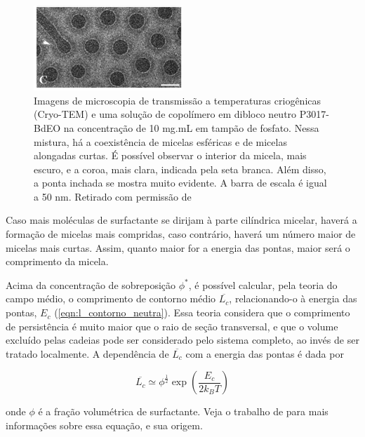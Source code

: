 		\begin{figure}[h]
			\centering
			\includegraphics[width=0.5\textwidth]{imagens/artigos/Cryo_TEM_Pontas_Danino_2009}
			\caption{Imagens de microscopia de transmissão a temperaturas criogênicas (Cryo-TEM) e uma solução de copolímero em dibloco neutro P3017-BdEO na concentração de 10 mg.mL\menosUm{} em tampão de fosfato. Nessa mistura, há a coexistência de micelas esféricas e de micelas alongadas curtas. É possível observar o interior da micela, mais escuro, e a coroa, mais clara, indicada pela seta branca. Além disso, a ponta inchada se mostra muito evidente. A barra de escala é igual a 50 nm. Retirado com permissão de \citeauthor{Shimoni2009}}
			\label{fig:pontas_inchadas_danino2009}
		\end{figure} 
				
		Caso mais moléculas de surfactante se dirijam à parte cilíndrica micelar, haverá a formação de micelas mais compridas, caso contrário, haverá um número maior de micelas mais curtas. Assim, quanto maior for a energia das pontas, maior será o comprimento da micela.\cite{May2001a}
		
		Acima da concentração de sobreposição \(\phi^*\), é possível calcular, pela teoria do campo médio, o comprimento de contorno médio \(\overline{L_c}\), relacionando-o à energia das pontas, \(E_c\) (\autoref{eqn:l_contorno_neutra})\cite{Cates1990}. Essa teoria considera que o comprimento de persistência é muito maior que o raio de seção transversal, e que o volume excluído pelas cadeias pode ser considerado pelo sistema completo, ao invés de ser tratado localmente. A dependência de \(\overline{L_c}\) com a energia das pontas é dada por 
		 
		
		\begin{equation}
			\overline{L_c} \simeq \phi^{\frac{1}{2}} \exp \left(\dfrac{E_c}{2k_BT}\right)
			\label{eqn:l_contorno_neutra}
		\end{equation} %
		
		\noindent onde \(\phi\) é a fração volumétrica de surfactante. Veja o trabalho de \citeauthor{Cates1990} para mais informações sobre essa equação, e sua origem.
		
